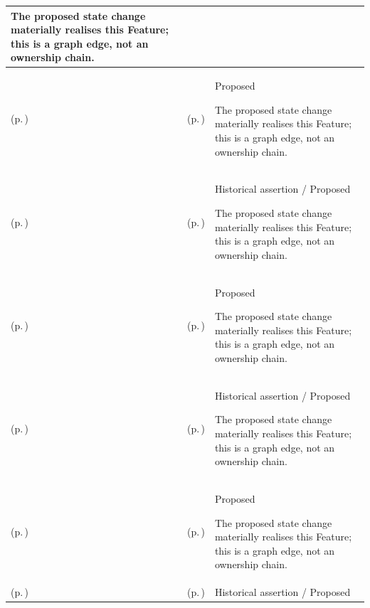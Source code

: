 \begin{longtable}{|>{\raggedright\arraybackslash}p{0.27\TableWidth}|>{\raggedright\arraybackslash}p{0.27\TableWidth}|>{\raggedright\arraybackslash}p{0.46\TableWidth}|}
The proposed state change materially realises this Feature; this is a graph edge, not an ownership chain.\\\hline
\nameref{function:assemble-associated-binary-content} (p.\,\pageref{function:assemble-associated-binary-content}) & \nameref{feature:binary-content-resolution-assembly} (p.\,\pageref{feature:binary-content-resolution-assembly}) & Proposed

The proposed state change materially realises this Feature; this is a graph edge, not an ownership chain.\\\hline
\nameref{function:qualify-information-authority-standing} (p.\,\pageref{function:qualify-information-authority-standing}) & \nameref{feature:information-authority-source-standing-representation} (p.\,\pageref{feature:information-authority-source-standing-representation}) & Historical assertion / Proposed

The proposed state change materially realises this Feature; this is a graph edge, not an ownership chain.\\\hline
\nameref{function:accept-governed-dataset-revision} (p.\,\pageref{function:accept-governed-dataset-revision}) & \nameref{feature:governed-dataset-content-revision} (p.\,\pageref{feature:governed-dataset-content-revision}) & Proposed

The proposed state change materially realises this Feature; this is a graph edge, not an ownership chain.\\\hline
\nameref{function:capture-required-significant-audit-evidence} (p.\,\pageref{function:capture-required-significant-audit-evidence}) & \nameref{feature:mandatory-significant-activity-audit-capture} (p.\,\pageref{feature:mandatory-significant-activity-audit-capture}) & Historical assertion / Proposed

The proposed state change materially realises this Feature; this is a graph edge, not an ownership chain.\\\hline
\nameref{function:record-significant-information-lineage} (p.\,\pageref{function:record-significant-information-lineage}) & \nameref{feature:information-transformation-lineage} (p.\,\pageref{feature:information-transformation-lineage}) & Proposed

The proposed state change materially realises this Feature; this is a graph edge, not an ownership chain.\\\hline
\nameref{function:coordinate-entity-relative-input} (p.\,\pageref{function:coordinate-entity-relative-input}) & \nameref{feature:entity-relative-activity-coordination} (p.\,\pageref{feature:entity-relative-activity-coordination}) & Historical assertion / Proposed


\end{longtable}
